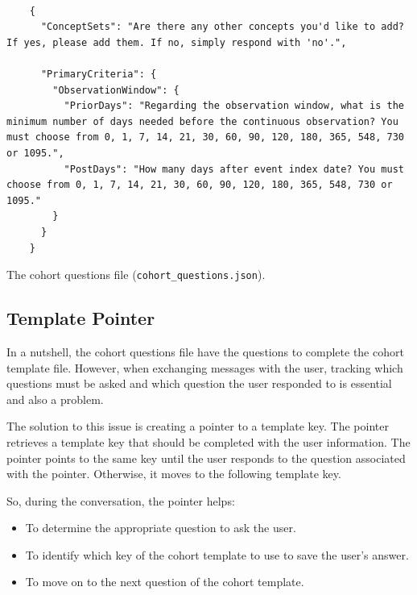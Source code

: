 \begin{listing}[H]
  \begin{verbatim}
      
    {
      "ConceptSets": "Are there any other concepts you'd like to add? If yes, please add them. If no, simply respond with 'no'.",
    
      "PrimaryCriteria": {
        "ObservationWindow": {
          "PriorDays": "Regarding the observation window, what is the minimum number of days needed before the continuous observation? You must choose from 0, 1, 7, 14, 21, 30, 60, 90, 120, 180, 365, 548, 730 or 1095.",
          "PostDays": "How many days after event index date? You must choose from 0, 1, 7, 14, 21, 30, 60, 90, 120, 180, 365, 548, 730 or 1095."
        }
      }
    }

  \end{verbatim}
  \caption{The cohort questions file {\small\normalfont(\texttt{cohort\_questions.json})}.}
  \label{questions}
\end{listing}



\subsection{Template Pointer}

In a nutshell, the cohort questions file have the questions to complete the cohort template file. However, when exchanging messages with the user, tracking which questions must be asked and which question the user responded to is essential and also a problem.

The solution to this issue is creating a pointer to a template key. The pointer retrieves a template key that should be completed with the user information. The pointer points to the same key until the user responds to the question associated with the pointer. Otherwise, it moves to the following template key.

So, during the conversation, the pointer helps:

\begin{itemize}
  \item To determine the appropriate question to ask the user.
  \item To identify which key of the cohort template to use to save the user's answer.
  \item To move on to the next question of the cohort template.
\end{itemize}

